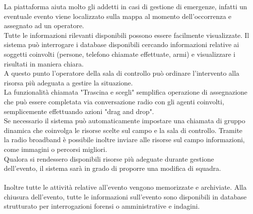 La piattaforma aiuta molto gli addetti in casi di gestione di emergenze, infatti un eventuale
evento viene localizzato sulla mappa al momento dell'occorrenza e assegnato ad un operatore.\\
Tutte le informazioni rilevanti disponibili possono essere facilmente visualizzate. 
Il sistema può interrogare i database disponibili cercando
informazioni relative ai soggetti coinvolti (persone, telefono
chiamate effettuate, armi) e visualizzare i risultati in maniera chiara.\\
A questo punto l'operatore della sala di controllo può ordinare l'intervento alla 
risorsa  più adeguata a gestire la situazione. 
\\La funzionalità chiamata "Trascina e scegli" semplifica
operazione di assegnazione che può essere completata via conversazione radio 
con gli agenti coinvolti, semplicemente effettuando azioni "drag and drop".\\
Se necessario il sistema può automaticamente impostare una chiamata di gruppo dinamica 
che coinvolga le risorse scelte sul campo e la sala di controllo. Tramite la radio broadband è possibile
inoltre inviare alle risorse sul campo informazioni, come immagini o percorsi migliori.
\\Qualora si rendessero disponibili risorse più adeguate durante
gestione dell'evento, il sistema sarà in grado di proporre una modifica di squadra.
\\\\
Inoltre tutte le attività relative all'evento vengono memorizzate e archiviate.
Alla chiusura dell'evento, tutte le informazioni sull'evento sono disponibili in
database strutturato per interrogazioni forensi o amministrative
e indagini.

\pagebreak

